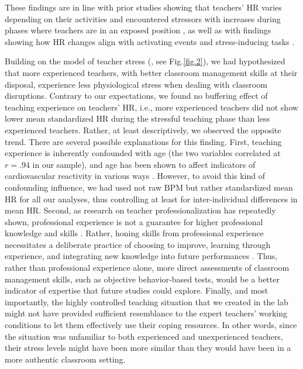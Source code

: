 \documentclass[preprint,
3p]{elsarticle} %
\begin{document}
These findings are in line with prior studies showing that teachers' HR
varies depending on their activities and encountered stressors with
increases during phases where teachers are in an exposed position
\citep{sperka1995, scheuch1997psychophysische, donker2018, junker2021},
as well as with findings showing how HR changes align with activating
events and stress-inducing tasks \citep{Darnell2019, chalmers2021}.

Building on the model of teacher stress (\citet{kyriacou1978}, see
Fig.\ref{fig.2}), we had hypothesized that more experienced teachers,
with better classroom management skills at their disposal, experience
less physiological stress when dealing with classroom disruptions.
Contrary to our expectations, we found no buffering effect of teaching
experience on teachers' HR, i.e., more experienced teachers did not show
lower mean standardized HR during the stressful teaching phase than less
experienced teachers. Rather, at least descriptively, we observed the
opposite trend. There are several possible explanations for this
finding. First, teaching experience is inherently confounded with age
(the two variables correlated at \(r = .94\) in our sample), and age has
been shown to affect indicators of cardiovascular reactivity in various
ways \citep{uchino2010older}. However, to avoid this kind of confounding
influence, we had used not raw BPM but rather standardized mean HR for
all our analyses, thus controlling at least for inter-individual
differences in mean HR. Second, as research on teacher
professionalization has repeatedly shown, professional experience is not
a guarantee for higher professional knowledge and skills
\citep{kirschner2016professionswissen}. Rather, honing skills from
professional experience necessitates a deliberate practice of choosing
to improve, learning through experience, and integrating new knowledge
into future performances \citep{dunn1999deliberate}. Thus, rather than
professional experience alone, more direct assessments of classroom
management skills, such as objective behavior-based tests, would be a
better indicator of expertise that future studies could explore.
Finally, and most importantly, the highly controlled teaching situation
that we created in the lab might not have provided sufficient
resemblance to the expert teachers' working conditions to let them
effectively use their coping resources. In other words, since the
situation was unfamiliar to both experienced and unexperienced teachers,
their stress levels might have been more similar than they would have
been in a more authentic classroom setting.
\end{document}
